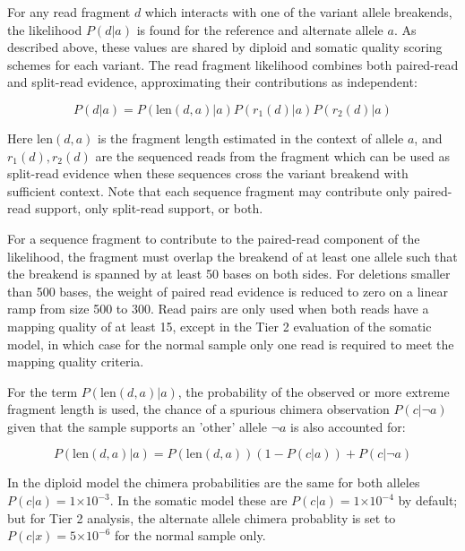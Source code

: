 \documentclass{article}
\newcommand{\e}[1]{\ensuremath{\times 10^{#1}}}
\begin{document}
For any read fragment $d$ which interacts with one of the variant allele breakends, the likelihood $P(d \vert a)$ is found for the reference and alternate allele $a$. As described above, these values are shared by diploid and somatic quality scoring schemes for each variant. The read fragment likelihood combines both paired-read and split-read evidence, approximating their contributions as independent:

\begin{equation*}
P(d \vert a) = P ( \text{len}(d,a) \vert a) P( r_1(d) \vert a) P ( r_2(d) \vert a)
\end{equation*}

Here $\text{len}(d,a)$ is the fragment length estimated in the context of allele $a$, and $r_1(d),r_2(d)$ are the sequenced reads from the fragment which can be used as split-read evidence when these sequences cross the variant breakend with sufficient context. Note that each sequence fragment may contribute only paired-read support, only split-read support, or both.

For a sequence fragment to contribute to the paired-read component of the likelihood, the fragment must overlap the breakend of at least one allele such that the breakend is spanned by at least 50 bases on both sides. For deletions smaller than 500 bases, the weight of paired read evidence is reduced to zero on a linear ramp from size 500 to 300. Read pairs are only used when both reads have a mapping quality of at least 15, except in the Tier 2 evaluation of the somatic model, in which case for the normal sample only one read is required to meet the mapping quality criteria.

For the term $P ( \text{len}(d,a) \vert a)$, the probability of the observed or more extreme fragment length is used, the chance of a spurious chimera observation $P(c \vert \neg a)$ given that the sample supports an 'other' allele $\neg a$ is also accounted for:

\begin{equation*}
P ( \text{len}(d,a) \vert a) = P ( \text{len}(d,a) ) (1-P(c \vert a))  + P (c \vert \neg a)
\end{equation*}

In the diploid model the chimera probabilities are the same for both alleles $P(c \vert a) =  1\e{-3}$. In the somatic model these are $P(c \vert a) =  1\e{-4}$ by default; but for Tier 2 analysis, the alternate allele chimera probablity is set to $P(c \vert x) =  5\e{-6}$ for the normal sample only.
\end{document}
